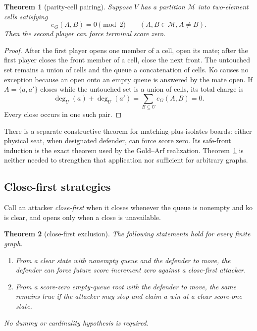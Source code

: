 \documentclass[11pt]{article}
\newtheorem{theorem}{Theorem}[section]
\theoremstyle{definition}
\theoremstyle{remark}
\begin{document}
\begin{theorem}[parity-cell pairing]\label{thm:cells}
Suppose $V$ has a partition $\mathcal M$ into two-element cells satisfying
\[
  e_G(A,B)=0\pmod2
  \qquad(A,B\in\mathcal M, A\ne B).
\]
Then the second player can force terminal score zero.
\end{theorem}

\begin{proof}
After the first player opens one member of a cell, open its mate; after the
first player closes the front member of a cell, close the next front.  The
untouched set remains a union of cells and the queue a concatenation of
cells.  Ko causes no exception because an open onto an empty queue is
answered by the mate open.  If $A=\{a,a'\}$ closes while the untouched set
is a union of cells, its total charge is
\[
  \deg_U(a)+\deg_U(a')=
  \sum_{B\subseteq U}e_G(A,B)=0.
\]
Every close occurs in one such pair.
\end{proof}

There is a separate constructive theorem for matching-plus-isolates boards:
either physical seat, when designated defender, can force score zero.  Its
safe-front induction is the exact theorem used by the Gold--Arf realization.
Theorem~\ref{thm:cells} is neither needed to strengthen that application nor
sufficient for arbitrary graphs.

\subsection{Close-first strategies}

Call an attacker \emph{close-first} when it closes whenever the queue is
nonempty and ko is clear, and opens only when a close is unavailable.

\begin{theorem}[close-first exclusion]\label{thm:close-first}
The following statements hold for every finite graph.
\begin{enumerate}
\item From a clear state with nonempty queue and the defender to move, the
      defender can force future score increment zero against a close-first
      attacker.
\item From a score-zero empty-queue root with the defender to move, the same
      remains true if the attacker may stop and claim a win at a clear
      score-one state.
\end{enumerate}
No dummy or cardinality hypothesis is required.
\end{theorem}
\end{document}
